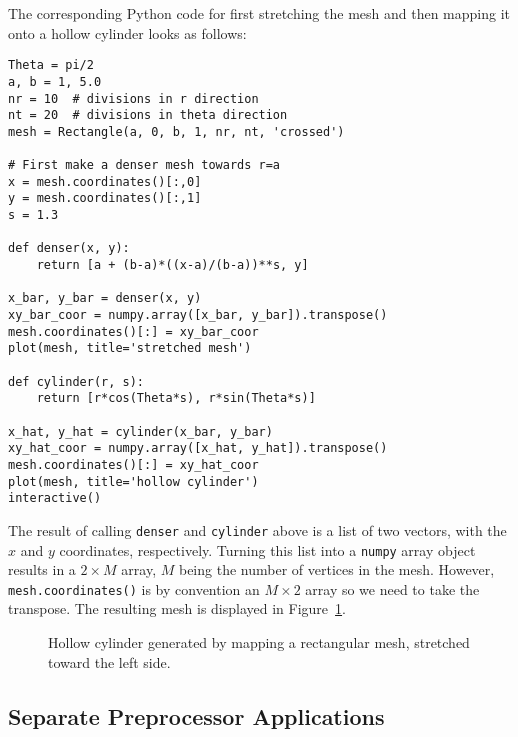 The corresponding Python code for first stretching the mesh and
then mapping it onto a hollow cylinder looks as follows:
\begin{Verbatim}[fontsize=\fontsize{10pt}{10pt},tabsize=8,baselinestretch=1.05,
fontfamily=tt,xleftmargin=7mm]
Theta = pi/2
a, b = 1, 5.0
nr = 10  # divisions in r direction
nt = 20  # divisions in theta direction
mesh = Rectangle(a, 0, b, 1, nr, nt, 'crossed')

# First make a denser mesh towards r=a
x = mesh.coordinates()[:,0]
y = mesh.coordinates()[:,1]
s = 1.3

def denser(x, y):
    return [a + (b-a)*((x-a)/(b-a))**s, y]

x_bar, y_bar = denser(x, y)
xy_bar_coor = numpy.array([x_bar, y_bar]).transpose()
mesh.coordinates()[:] = xy_bar_coor
plot(mesh, title='stretched mesh')

def cylinder(r, s):
    return [r*cos(Theta*s), r*sin(Theta*s)]

x_hat, y_hat = cylinder(x_bar, y_bar)
xy_hat_coor = numpy.array([x_hat, y_hat]).transpose()
mesh.coordinates()[:] = xy_hat_coor
plot(mesh, title='hollow cylinder')
interactive()
\end{Verbatim}
\noindent
The result of calling {\fontsize{12pt}{12pt}\texttt{denser}} and {\fontsize{12pt}{12pt}\texttt{cylinder}} above is a list of two
vectors, with the $x$ and $y$ coordinates, respectively.
Turning this list into a {\fontsize{12pt}{12pt}\texttt{numpy}} array object results in a $2\times M$ 
array, $M$ being the number of vertices in the mesh. However,
{\fontsize{12pt}{12pt}\texttt{mesh.coordinates()}} is by convention an $M\times 2$ array so we
need to take the transpose. The resulting mesh is displayed
in Figure~\ref{langtangen:mesh:transform:cyl:fig1}.
\begin{figure}
  \centerline{
  {}}
  \caption{\label{langtangen:mesh:transform:cyl:fig1}
  Hollow cylinder generated by mapping a rectangular mesh, stretched toward
  the left side.
  }
\end{figure}


%


\subsection{Separate Preprocessor Applications}

